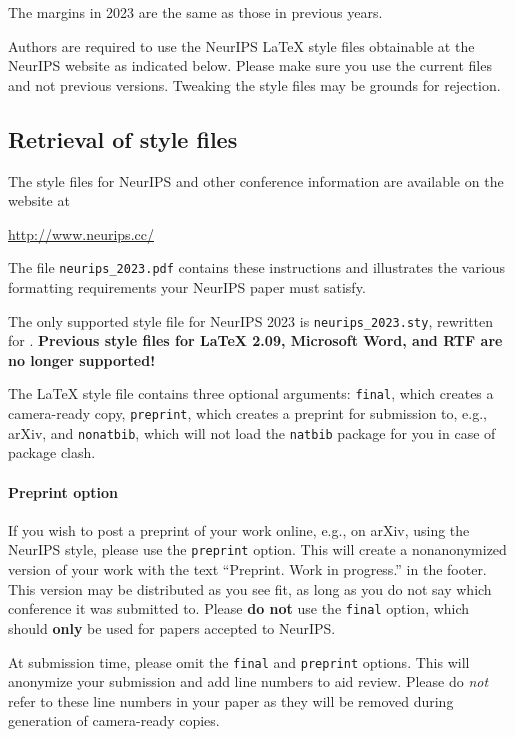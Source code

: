 \documentclass{article}
\begin{document}
The margins in 2023 are the same as those in previous years.


Authors are required to use the NeurIPS \LaTeX{} style files obtainable at the
NeurIPS website as indicated below. Please make sure you use the current files
and not previous versions. Tweaking the style files may be grounds for
rejection.


\subsection{Retrieval of style files}


The style files for NeurIPS and other conference information are available on
the website at
\begin{center}
  \url{http://www.neurips.cc/}
\end{center}
The file \verb+neurips_2023.pdf+ contains these instructions and illustrates the
various formatting requirements your NeurIPS paper must satisfy.


The only supported style file for NeurIPS 2023 is \verb+neurips_2023.sty+,
rewritten for \LaTeXe{}.  \textbf{Previous style files for \LaTeX{} 2.09,
  Microsoft Word, and RTF are no longer supported!}


The \LaTeX{} style file contains three optional arguments: \verb+final+, which
creates a camera-ready copy, \verb+preprint+, which creates a preprint for
submission to, e.g., arXiv, and \verb+nonatbib+, which will not load the
\verb+natbib+ package for you in case of package clash.


\paragraph{Preprint option}
If you wish to post a preprint of your work online, e.g., on arXiv, using the
NeurIPS style, please use the \verb+preprint+ option. This will create a
nonanonymized version of your work with the text ``Preprint. Work in progress.''
in the footer. This version may be distributed as you see fit, as long as you do not say which conference it was submitted to. Please \textbf{do
  not} use the \verb+final+ option, which should \textbf{only} be used for
papers accepted to NeurIPS.


At submission time, please omit the \verb+final+ and \verb+preprint+
options. This will anonymize your submission and add line numbers to aid
review. Please do \emph{not} refer to these line numbers in your paper as they
will be removed during generation of camera-ready copies.
\end{document}
